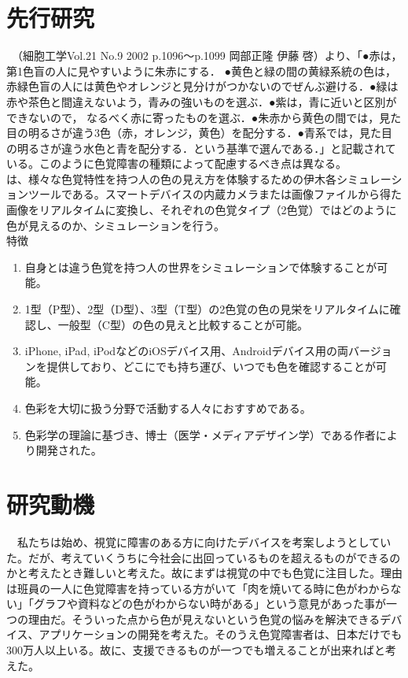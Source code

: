 \section{先行研究}
　\cite{色覚の多様性と色覚バリアフリーなプレゼンテーション}（細胞工学Vol.21 No.9 2002 p.1096～p.1099 岡部正隆 伊藤 啓）より、「●赤は，第1色盲の人に見やすいように朱赤にする． ●黄色と緑の間の黄緑系統の色は，赤緑色盲の人には黄色やオレンジと見分けがつかないのでぜんぶ避ける．●緑は赤や茶色と間違えないよう，青みの強いものを選ぶ．●紫は，青に近いと区別ができないので， なるべく赤に寄ったものを選ぶ．●朱赤から黄色の間では，見た目の明るさが違う3色（赤，オレンジ，黄色）を配分する．●青系では，見た目の明るさが違う水色と青を配分する．という基準で選んである．」と記載されている。このように色覚障害の種類によって配慮するべき点は異なる。\\
\cite{色のシミュレータ}は、様々な色覚特性を持つ人の色の見え方を体験するための伊木各シミュレーションツールである。スマートデバイスの内蔵カメラまたは画像ファイルから得た画像をリアルタイムに変換し、それぞれの色覚タイプ（2色覚）ではどのように色が見えるのか、シミュレーションを行う。\\
特徴\\
\begin{enumerate}
  \item 自身とは違う色覚を持つ人の世界をシミュレーションで体験することが可能。
  \item 1型（P型）、2型（D型）、3型（T型）の2色覚の色の見栄をリアルタイムに確認し、一般型（C型）の色の見えと比較することが可能。
  \item iPhone, iPad, iPodなどのiOSデバイス用、Androidデバイス用の両バージョンを提供しており、どこにでも持ち運び、いつでも色を確認することが可能。
  \item 色彩を大切に扱う分野で活動する人々におすすめである。
  \item 色彩学の理論に基づき、博士（医学・メディアデザイン学）である作者により開発された。
\end{enumerate}

\section{研究動機}
　私たちは始め、視覚に障害のある方に向けたデバイスを考案しようとしていた。だが、考えていくうちに今社会に出回っているものを超えるものができるのかと考えたとき難しいと考えた。故にまずは視覚の中でも色覚に注目した。理由は班員の一人に色覚障害を持っている方がいて「肉を焼いてる時に色がわからない」「グラフや資料などの色がわからない時がある」という意見があった事が一つの理由だ。そういった点から色が見えないという色覚の悩みを解決できるデバイス、アプリケーションの開発を考えた。そのうえ色覚障害者は、日本だけでも300万人以上いる。故に、支援できるものが一つでも増えることが出来ればと考えた。

